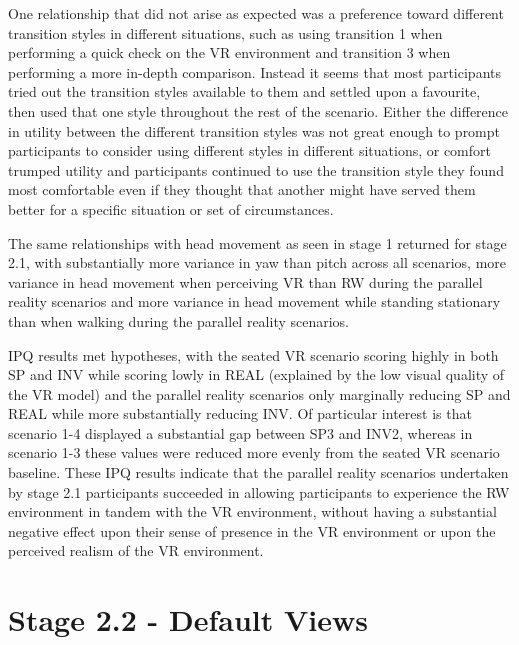 One relationship that did not arise as expected was a preference toward different transition styles in different situations, such as using transition 1 when performing a quick check on the VR environment and transition 3 when performing a more in-depth comparison. Instead it seems that most participants tried out the transition styles available to them and settled upon a favourite, then used that one style throughout the rest of the scenario. Either the difference in utility between the different transition styles was not great enough to prompt participants to consider using different styles in different situations, or comfort trumped utility and participants continued to use the transition style they found most comfortable even if they thought that another might have served them better for a specific situation or set of circumstances.

The same relationships with head movement as seen in stage 1 returned for stage 2.1, with substantially more variance in yaw than pitch across all scenarios, more variance in head movement when perceiving VR than RW during the parallel reality scenarios and more variance in head movement while standing stationary than when walking during the parallel reality scenarios.

IPQ results met hypotheses, with the seated VR scenario scoring highly in both SP and INV while scoring lowly in REAL (explained by the low visual quality of the VR model) and the parallel reality scenarios only marginally reducing SP and REAL while more substantially reducing INV. Of particular interest is that scenario 1-4 displayed a substantial gap between SP3 and INV2, whereas in scenario 1-3 these values were reduced more evenly from the seated VR scenario baseline. These IPQ results indicate that the parallel reality scenarios undertaken by stage 2.1 participants succeeded in allowing participants to experience the RW environment in tandem with the VR environment, without having a substantial negative effect upon their sense of presence in the VR environment or upon the perceived realism of the VR environment.




\section{Stage 2.2 - Default Views}

